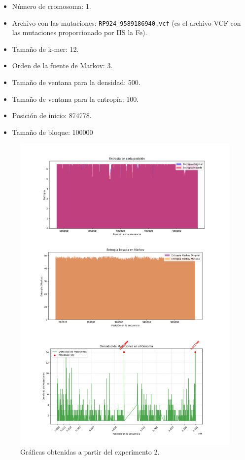 \documentclass[11pt,spanish,listoffigures,listoftables]{tfgetsinf}
\begin{document}
\begin{itemize}
   \item Número de cromosoma: 1.
   \item Archivo con las mutaciones: \texttt{RP924\_9589186940.vcf}  (es el archivo \acs{VCF} con las mutaciones proporcionado por \acs{IIS} la Fe).
   \item Tamaño de k-mer: 12.
   \item Orden de la fuente de Markov: 3.
   \item Tamaño de ventana para la densidad: 500.
   \item Tamaño de ventana para la entropía: 100.
   \item Posición de inicio: 874778.
   \item Tamaño de bloque: 100000 
\end{itemize}

\begin{figure}[H]
      \centering
      \includegraphics[width=1.0\textwidth]{graf_exp2.png}
      \caption{Gráficas obtenidas a partir del experimento 2.}
      \label{fig:etiqueta_opcional17}
\end{figure}
\end{document}
